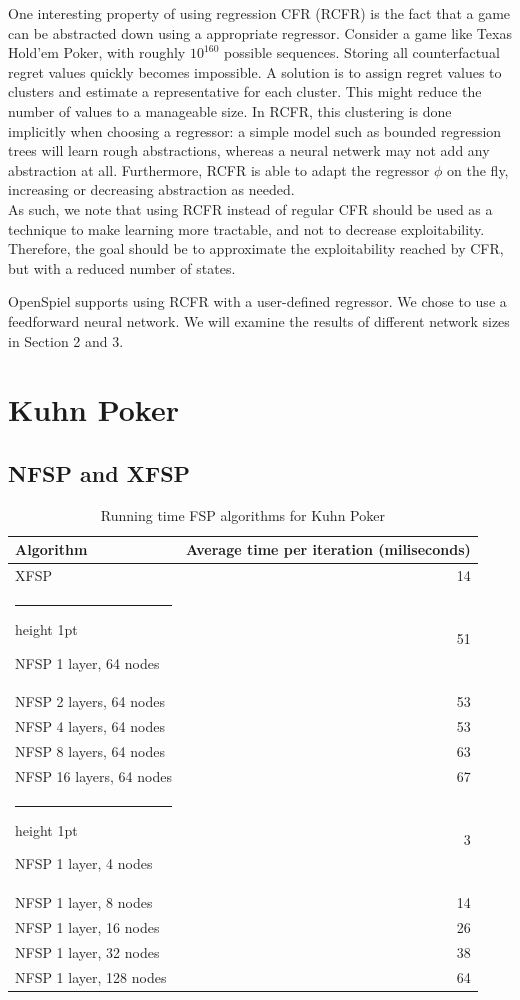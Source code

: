 \documentclass[10pt,a4paper]{article}
\makeatletter
\newcommand{\thickhline}{%
    \noalign {\ifnum 0=`}\fi \hrule height 1pt
    \futurelet \reserved@a \@xhline
}
\makeatother
\begin{document}
One interesting property of using regression CFR (RCFR) is the fact that a game can be abstracted down using a appropriate regressor. Consider a game like Texas Hold'em Poker, with roughly $10^{160}$ possible sequences. Storing all counterfactual regret values quickly becomes impossible. A solution is to assign regret values to clusters and estimate a representative for each cluster. This might reduce the number of values to a manageable size. In RCFR, this clustering is done implicitly when choosing a regressor: a simple model such as bounded regression trees will learn rough abstractions, whereas a neural netwerk may not add any abstraction at all. Furthermore, RCFR is able to adapt the regressor $\phi$ on the fly, increasing or decreasing abstraction as needed.\\

As such, we note that using RCFR instead of regular CFR should be used as a technique to make learning more tractable, and not to decrease exploitability. Therefore, the goal should be to approximate the exploitability reached by CFR, but with a reduced number of states.

OpenSpiel supports using RCFR with a user-defined regressor. We chose to use a feedforward neural network. We will examine the results of different network sizes in Section 2 and 3.


\section{Kuhn Poker}
\subsection{NFSP and XFSP}
\begin{table}[h]
\begin{center}
\begin{tabular}{|l|r|}
\hline 
Algorithm & Average time per iteration (miliseconds) \\
\hline 
XFSP & 14 \\ 
\thickhline 
NFSP 1 layer, 64 nodes & 51 \\ 
\hline 
NFSP 2 layers, 64 nodes  & 53 \\ 
\hline 
NFSP 4 layers, 64 nodes & 53 \\ 
\hline 
NFSP 8 layers, 64 nodes & 63 \\ 
\hline 
NFSP 16 layers, 64 nodes & 67 \\ 
\thickhline
NFSP 1 layer, 4 nodes & 3 \\ 
\hline 
NFSP 1 layer, 8 nodes & 14 \\ 
\hline 
NFSP 1 layer, 16 nodes & 26 \\ 
\hline 
NFSP 1 layer, 32 nodes & 38 \\ 
\hline 
NFSP 1 layer, 128 nodes & 64 \\ 
\hline 
\end{tabular}
\caption{Running time FSP algorithms for Kuhn Poker}
\end{center}
\end{table} 
\end{document}
